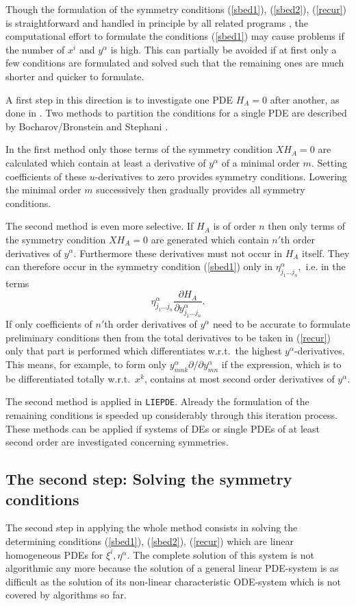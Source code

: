 \documentclass[12pt]{article}
\begin{document}
Though the formulation of the symmetry conditions (\ref{sbed1}),
(\ref{sbed2}), (\ref{recur})
is straightforward and handled in principle by all related
programs \cite{WHer}, the computational effort to formulate
the conditions (\ref{sbed1}) may cause problems if
the number of $x^i$ and $y^\alpha$ is high.  This can
partially be avoided if at first only a few conditions are formulated
and solved such that the remaining ones are much shorter and quicker to
formulate.

A first step in this direction is to investigate one PDE $H_A = 0$
after another, as done in \cite{Cham}.  Two methods to partition the
conditions for a single PDE are described by Bocharov/Bronstein
\cite{Alex} and Stephani \cite{Step}.

In the first method only those terms of the symmetry condition
$X H_A = 0$ are calculated which contain 
at least a derivative of $y^\alpha$ of a minimal order $m.$ 
Setting coefficients
of these $u$-derivatives to zero provides symmetry conditions. Lowering the
minimal order $m$ successively then gradually provides all symmetry conditions.

The second method is even more selective. If $H_A$ is of order $n$
then only terms of the symmetry condition $X H_A = 0$ are generated which
contain $n'$th order derivatives of $y^\alpha.$ Furthermore these derivatives
must not occur in $H_A$ itself. They can therefore occur 
in the symmetry condition
(\ref{sbed1}) only in
$\eta^\alpha_{j_1\ldots j_n},$ i.e. in the terms
\[\eta^\alpha_{j_1\ldots j_n}
\frac{\partial H_A}{\partial y^\alpha_{j_1\ldots j_n}}. \]
If only coefficients of $n'$th order derivatives of $y^\alpha$ need to be
accurate to formulate preliminary conditions
then from the total derivatives to be taken in
(\ref{recur}) only that part is performed which differentiates w.r.t.\ the
highest $y^\alpha$-derivatives.
This means, for example, to form only
$y^\alpha_{mnk} \partial/\partial y^\alpha_{mn} $
if the expression, which is to be differentiated totally w.r.t.\ $x^k$,
contains at most second order derivatives of $y^\alpha.$

The second method is applied in {\tt LIEPDE}.
Already the formulation of the remaining conditions is speeded up
considerably through this iteration process. These methods can be applied if
systems of DEs or single PDEs of at least second order are investigated
concerning symmetries.
\subsection{The second step: Solving the symmetry conditions}
The second step in applying the whole method consists in solving the
determining conditions (\ref{sbed1}), (\ref{sbed2}), (\ref{recur})
which are linear homogeneous PDEs for $\xi^i, \eta^\alpha$. The
complete solution of this system is not algorithmic any more because the
solution of a general linear PDE-system is as difficult as the solution of
its non-linear characteristic ODE-system which is not covered by algorithms
so far.
\end{document}

